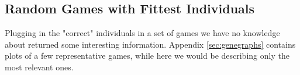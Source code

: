 \subsection{Random Games with Fittest Individuals}\label{sec:randGamesFitInd}
Plugging in the "correct" individuals in a set of games we have no knowledge about returned some interesting information. Appendix \ref{sec:genegraphs} contains plots of a few representative games, while here we would be describing only the most relevant ones.\\
\begin{figure}[ht!]
\centering
    \quad

\end{figure}
